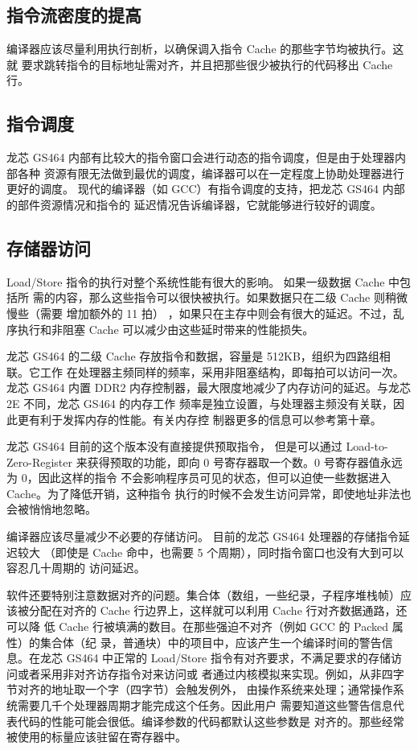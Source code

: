 \subsection{指令流密度的提高}

编译器应该尽量利用执行剖析，以确保调入指令 Cache 的那些字节均被执行。这就
要求跳转指令的目标地址需对齐，并且把那些很少被执行的代码移出 Cache 行。

\subsection{指令调度}

龙芯 GS464 内部有比较大的指令窗口会进行动态的指令调度，但是由于处理器内部各种
资源有限无法做到最优的调度，编译器可以在一定程度上协助处理器进行更好的调度。
现代的编译器（如 GCC）有指令调度的支持，把龙芯 GS464 内部的部件资源情况和指令的
延迟情况告诉编译器，它就能够进行较好的调度。

\subsection{存储器访问}

Load/Store 指令的执行对整个系统性能有很大的影响。   如果一级数据 Cache 中包括所
需的内容，那么这些指令可以很快被执行。如果数据只在二级 Cache 则稍微慢些（需要
增加额外的 11 拍）     ，如果只在主存中则会有很大的延迟。不过，乱序执行和非阻塞 Cache
可以减少由这些延时带来的性能损失。

龙芯 GS464 的二级 Cache 存放指令和数据，容量是 512KB，组织为四路组相联。它工作
在处理器主频同样的频率，采用非阻塞结构，即每拍可以访问一次。龙芯 GS464 内置 DDR2
内存控制器，最大限度地减少了内存访问的延迟。与龙芯 2E 不同，龙芯 GS464 的内存工作
频率是独立设置，与处理器主频没有关联，因此更有利于发挥内存的性能。有关内存控
制器更多的信息可以参考第十章。

龙芯 GS464 目前的这个版本没有直接提供预取指令，     但是可以通过
Load-to-Zero-Register 来获得预取的功能，即向 0 号寄存器取一个数。0
号寄存器值永远为 0，因此这样的指令
不会影响程序员可见的状态，但可以迫使一些数据进入 Cache。为了降低开销，这种指令
执行的时候不会发生访问异常，即使地址非法也会被悄悄地忽略。

编译器应该尽量减少不必要的存储访问。     目前的龙芯 GS464 处理器的存储指令延迟较大
（即使是 Cache 命中，也需要 5 个周期），同时指令窗口也没有大到可以容忍几十周期的
访问延迟。

软件还要特别注意数据对齐的问题。集合体（数组，一些纪录，子程序堆栈帧）应
该被分配在对齐的 Cache 行边界上，这样就可以利用 Cache 行对齐数据通路，还可以降
低 Cache 行被填满的数目。在那些强迫不对齐（例如 GCC 的 Packed 属性）的集合体（纪
录，普通块）中的项目中，应该产生一个编译时间的警告信息。在龙芯 GS464 中正常的
Load/Store 指令有对齐要求，不满足要求的存储访问或者采用非对齐访存指令对来访问或
者通过内核模拟来实现。例如，从非四字节对齐的地址取一个字（四字节）会触发例外，
由操作系统来处理；通常操作系统需要几千个处理器周期才能完成这个任务。因此用户
需要知道这些警告信息代表代码的性能可能会很低。编译参数的代码都默认这些参数是
对齐的。那些经常被使用的标量应该驻留在寄存器中。

